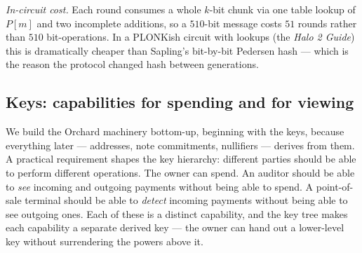 \documentclass[11pt,a4paper]{article}
\theoremstyle{definition}
\begin{document}
\emph{In-circuit cost.} Each round consumes a whole $k$-bit
chunk via one table lookup of $P[m]$ and two incomplete additions, so a
$510$-bit message costs $51$ rounds rather than $510$ bit-operations. In a
PLONKish circuit with lookups (the \emph{Halo 2 Guide}) this is dramatically
cheaper than Sapling's bit-by-bit Pedersen hash --- which is the reason
the protocol changed hash between generations.

\subsection{Keys: capabilities for spending and for viewing}\label{sec:orchard-keys}

We build the Orchard machinery bottom-up, beginning with the keys, because
everything later --- addresses, note commitments, nullifiers --- derives
from them. A practical requirement shapes the key hierarchy:
different parties should be able to perform different operations. The owner can
spend. An auditor should be able to \emph{see} incoming and outgoing
payments without being able to spend. A point-of-sale terminal should be
able to \emph{detect} incoming payments without being able to see
outgoing ones. Each of these is a distinct capability, and the key tree
makes each capability a separate derived key --- the owner can hand out a
lower-level key without surrendering the powers above it.
\end{document}
